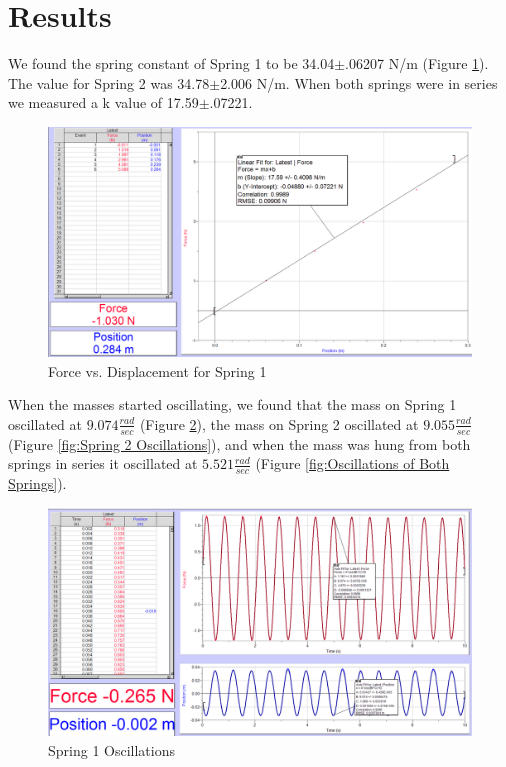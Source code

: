 \documentclass[]{article}
\begin{document}
\section{Results}

We found the spring constant of Spring 1 to be 34.04$\pm$.06207 N/m (Figure \ref{Force vs. Displacement for Spring 1}). The value for Spring 2 was 34.78$\pm$2.006 N/m. When both springs were in series we measured a k value of 17.59$\pm$.07221.


\begin{figure}[H]
	\centering
	\includegraphics[width=\textwidth]{res/lab_1}
	\caption{Force vs. Displacement for Spring 1}
	\label{Force vs. Displacement for Spring 1}
\end{figure}


When the masses started oscillating, we found that the mass on Spring 1 oscillated at $9.074 \frac{rad}{sec}$ (Figure \ref{fig:Spring 1 Oscillations}), the mass on Spring 2 oscillated at $9.055\frac{rad}{sec}$ (Figure \ref{fig:Spring 2 Oscillations}), and when the mass was hung from both springs in series it oscillated at $5.521\frac{rad}{sec}$ (Figure \ref{fig:Oscillations of Both Springs}).

\begin{figure}[H]
	\centering
	\includegraphics[width=\textwidth]{res/oscillations_spring_1}
	\caption{Spring 1 Oscillations}
	\label{fig:Spring 1 Oscillations}
\end{figure}
\end{document}
